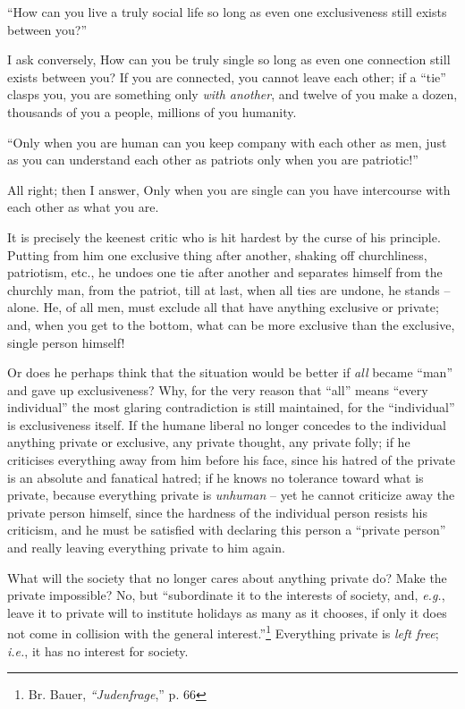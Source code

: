 \documentclass[12pt,a4paper]{book}
\begin{document}
``How can you live a truly social life so long as even one exclusiveness 
still exists between you?''

I ask conversely, How can you be truly single so long as even one connection 
still exists between you? If you are connected, you cannot leave each other; 
if a ``tie'' clasps you, you are something only \textit{with another}, and 
twelve of you make a dozen, thousands of you a people, millions of you 
humanity.

``Only when you are human can you keep company with each other as men, just 
as you can understand each other as patriots only when you are patriotic!''

All right; then I answer, Only when you are single can you have intercourse 
with each other as what you are.

It is precisely the keenest critic who is hit hardest by the curse of his 
principle. Putting from him one exclusive thing after another, shaking off 
churchliness, patriotism, etc., he undoes one tie after another and separates 
himself from the churchly man, from the patriot, till at last, when all ties 
are undone, he stands -- alone. He, of all men, must exclude all that have 
anything exclusive or private; and, when you get to the bottom, what can be 
more exclusive than the exclusive, single person himself!

Or does he perhaps think that the situation would be better if \textit{all} 
became ``man'' and gave up exclusiveness? Why, for the very reason that 
``all'' means ``every individual'' the most glaring contradiction is still 
maintained, for the ``individual'' is exclusiveness itself. If the humane 
liberal no longer concedes to the individual anything private or exclusive, 
any private thought, any private folly; if he criticises everything away from 
him before his face, since his hatred of the private is an absolute and 
fanatical hatred; if he knows no tolerance toward what is private, because 
everything private is \textit{unhuman} -- yet he cannot criticize away the 
private person himself, since the hardness of the individual person resists 
his criticism, and he must be satisfied with declaring this person a 
``private person'' and really leaving everything private to him again.

What will the society that no longer cares about anything private do? Make the 
private impossible? No, but ``subordinate it to the interests of society, 
and, \textit{e.g.}, leave it to private will to institute holidays as many as 
it chooses, if only it does not come in collision with the general 
interest.''\footnote{Br. Bauer, \textit{``Judenfrage},'' p. 66} Everything 
private is \textit{left free}; \textit{i.e.}, it has no interest for society.
\end{document}

